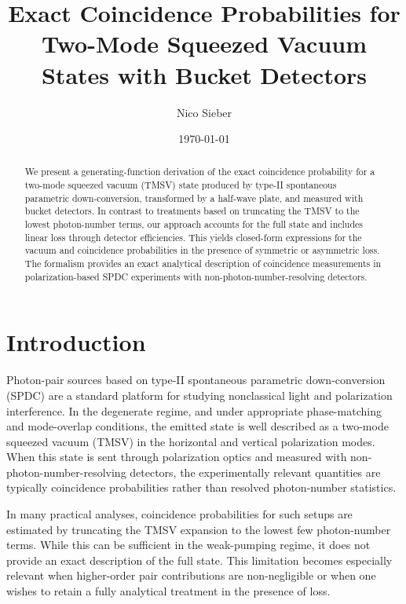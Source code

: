 \documentclass[%
 reprint,
 amsmath,amssymb,
 aps,
twocolumn
]{revtex4-2}
\begin{document}


\title{Exact Coincidence Probabilities for Two-Mode Squeezed Vacuum States with Bucket Detectors}%

\author{Nico Sieber}

\date{\today}
\begin{abstract}
We present a generating-function derivation of the exact coincidence probability for a two-mode squeezed vacuum (TMSV) state produced by type-II spontaneous parametric down-conversion, transformed by a half-wave plate, and measured with bucket detectors. In contrast to treatments based on truncating the TMSV to the lowest photon-number terms, our approach accounts for the full state and includes linear loss through detector efficiencies. This yields closed-form expressions for the vacuum and coincidence probabilities in the presence of symmetric or asymmetric loss. The formalism provides an exact analytical description of coincidence measurements in polarization-based SPDC experiments with non-photon-number-resolving detectors.
\end{abstract}
\maketitle
\section{Introduction}
Photon-pair sources based on type-II spontaneous parametric down-conversion (SPDC) are a standard platform for studying nonclassical light and polarization interference. In the degenerate regime, and under appropriate phase-matching and mode-overlap conditions, the emitted state is well described as a two-mode squeezed vacuum (TMSV) in the horizontal and vertical polarization modes. When this state is sent through polarization optics and measured with non-photon-number-resolving detectors, the experimentally relevant quantities are typically coincidence probabilities rather than resolved photon-number statistics.

In many practical analyses, coincidence probabilities for such setups are estimated by truncating the TMSV expansion to the lowest few photon-number terms. While this can be sufficient in the weak-pumping regime, it does not provide an exact description of the full state. This limitation becomes especially relevant when higher-order pair contributions are non-negligible or when one wishes to retain a fully analytical treatment in the presence of loss.
\end{document}
